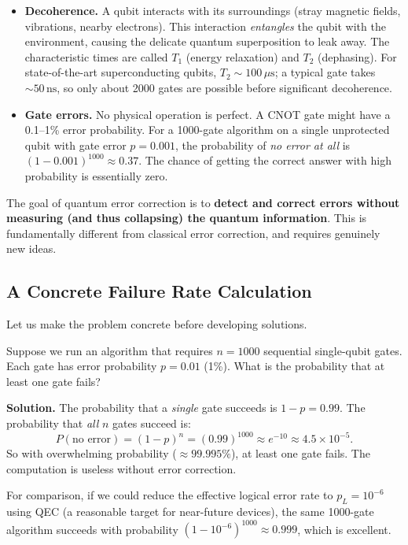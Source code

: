 \documentclass[11pt, a4paper]{article}
\theoremstyle{definition}
\theoremstyle{plain}
\theoremstyle{remark}
\begin{document}
\begin{itemize}
  \item \textbf{Decoherence.} A qubit interacts with its surroundings (stray
        magnetic fields, vibrations, nearby electrons).  This interaction
        \emph{entangles} the qubit with the environment, causing the delicate
        quantum superposition to leak away.  The characteristic times are
        called $T_1$ (energy relaxation) and $T_2$ (dephasing).  For
        state-of-the-art superconducting qubits, $T_2 \sim 100\,\mu\text{s}$;
        a typical gate takes $\sim 50\,\text{ns}$, so only about 2000 gates
        are possible before significant decoherence.

  \item \textbf{Gate errors.} No physical operation is perfect.  A CNOT gate
        might have a 0.1--1\% error probability.  For a 1000-gate algorithm
        on a single unprotected qubit with gate error $p = 0.001$, the
        probability of \emph{no error at all} is $(1-0.001)^{1000} \approx
        0.37$.  The chance of getting the correct answer with high probability
        is essentially zero.
\end{itemize}

\begin{keypoint}
The goal of quantum error correction is to \textbf{detect and correct errors
without measuring (and thus collapsing) the quantum information}.  This is
fundamentally different from classical error correction, and requires
genuinely new ideas.
\end{keypoint}

\subsection{A Concrete Failure Rate Calculation}

Let us make the problem concrete before developing solutions.

\begin{workedexample}
Suppose we run an algorithm that requires $n = 1000$ sequential single-qubit
gates.  Each gate has error probability $p = 0.01$ (1\%).  What is the
probability that at least one gate fails?

\medskip
\textbf{Solution.}
The probability that a \emph{single} gate succeeds is $1 - p = 0.99$.
The probability that \emph{all} $n$ gates succeed is:
\[
  P(\text{no error}) = (1 - p)^n = (0.99)^{1000} \approx e^{-10} \approx
  4.5 \times 10^{-5}.
\]
So with overwhelming probability ($\approx 99.995\%$), at least one gate
fails.  The computation is useless without error correction.

\medskip
For comparison, if we could reduce the effective logical error rate to
$p_L = 10^{-6}$ using QEC (a reasonable target for near-future devices), the
same 1000-gate algorithm succeeds with probability
$(1 - 10^{-6})^{1000} \approx 0.999$, which is excellent.
\end{workedexample}
\end{document}
